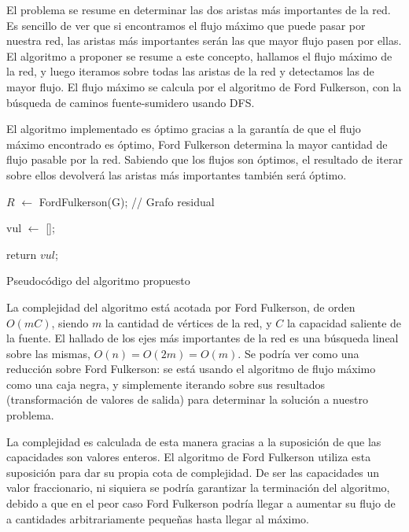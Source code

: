 \documentclass{article}
\begin{document}
El problema se resume en determinar las dos aristas más importantes de la red. Es sencillo de ver que si encontramos el flujo máximo que puede pasar por nuestra red, las aristas más importantes serán las que mayor flujo pasen por ellas. El algoritmo a proponer se resume a este concepto, hallamos el flujo máximo de la red, y luego iteramos sobre todas las aristas de la red y detectamos las de mayor flujo. El flujo máximo se calcula por el algoritmo de Ford Fulkerson, con la búsqueda de caminos fuente-sumidero usando DFS. 

El algoritmo implementado es óptimo gracias a la garantía de que el flujo máximo encontrado es óptimo, Ford Fulkerson determina la mayor cantidad de flujo pasable por la red. Sabiendo que los flujos son óptimos, el resultado de iterar sobre ellos devolverá las aristas más importantes también será óptimo.

\begin{algorithm}
    \BlankLine

    $R$ $\leftarrow$ FordFulkerson(G); // Grafo residual
    
    vul $\leftarrow$ [];

    return $vul$;

    \caption{Pseudocódigo del algoritmo propuesto}
\end{algorithm}

La complejidad del algoritmo está acotada por Ford Fulkerson, de orden $O(mC)$, siendo $m$ la cantidad de vértices de la red, y $C$ la capacidad saliente de la fuente. El hallado de los ejes más importantes de la red es una búsqueda lineal sobre las mismas, $O(n) = O(2m) = O(m)$. Se podría ver como una reducción sobre Ford Fulkerson: se está usando el algoritmo de flujo máximo como una caja negra, y simplemente iterando sobre sus resultados (transformación de valores de salida) para determinar la solución a nuestro problema.

La complejidad es calculada de esta manera gracias a la suposición de que las capacidades son valores enteros. El algoritmo de Ford Fulkerson utiliza esta suposición para dar su propia cota de complejidad. De ser las capacidades un valor fraccionario, ni siquiera se podría garantizar la terminación del algoritmo, debido a que en el peor caso Ford Fulkerson podría llegar a aumentar su flujo de a cantidades arbitrariamente pequeñas hasta llegar al máximo.
\end{document}
